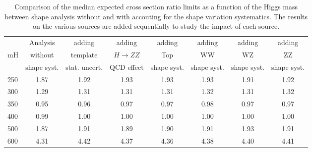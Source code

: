 \begin{table}[!ht]
\begin{center}
{\normalsize
\begin{tabular}{|l|c|cccccc|}
\hline
      &  Analysis    & adding          &  adding      &  adding      &  adding      & adding      & adding \\
mH  &  without     & template        &  $H\to ZZ$   &  Top         &  WW          & WZ          & ZZ \\
      &  shape syst. & stat. uncert.   &  QCD effect &  shape syst. &  shape syst. & shape syst. & shape syst. \\
\hline
250 & 1.87 & 1.92 & 1.93 & 1.93 & 1.93 & 1.91 & 1.92 \\
300 & 1.29 & 1.31 & 1.31 & 1.31 & 1.32 & 1.31 & 1.32 \\
350 & 0.95 & 0.96 & 0.97 & 0.97 & 0.98 & 0.97 & 0.97 \\
400 & 0.99 & 1.00 & 1.00 & 1.00 & 1.00 & 1.00 & 1.00 \\
500 & 1.87 & 1.91 & 1.89 & 1.90 & 1.91 & 1.93 & 1.91 \\
600 & 4.31 & 4.42 & 4.37 & 4.36 & 4.38 & 4.40 & 4.41 \\
\hline
\end{tabular}
}
\caption{Comparison of the median expected cross section ratio limits as a function 
of the Higgs mass between shape analysis without and with accouting for the 
shape variation systematics. The results on the various sources are added sequentially 
to study the impact of each source. }
\label{tab:mva_mtshape_detail}
\end{center}
\end{table}
